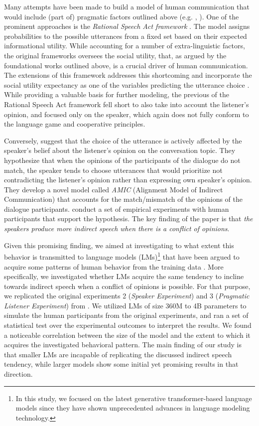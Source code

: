 \documentclass[11pt]{article}
\begin{document}
Many attempts have been made to build a model of human communication that would include (part of) pragmatic factors outlined above (e.g. \citealt{achimova-2022}, \citealt{goodman-2013}). One of the prominent approaches is the \textit{Rational Speech Act framework} \citep{goodman-2012}. The model assigns probabilities to the possible utterances from a fixed set based on their expected informational utility. While accounting for a number of extra-linguistic factors, the original frameworks oversees the social utility, that, as argued by the foundational works outlined above, is a crucial driver of human communication. The extensions of this framework addresses this shortcoming and incorporate the social utility expectancy as one of the variables predicting the utterance choice \citep{carcassi-2023}. While providing a valuable basis for further modeling, the previous of the Rational Speech Act framework fell short to also take into account the listener's opinion, and focused only on the speaker, which again does not fully conform to the language game and cooperative principles.

Conversely, \citet{achimova-2025} suggest that the choice of the utterance is actively affected by the speaker’s belief about the listener’s opinion on the conversation topic. They hypothesize that when the opinions of the participants of the dialogue do not match, the speaker tends to choose utterances that would prioritize not contradicting the listener's opinion rather than expressing own speaker's opinion. They develop a novel model called \textit{AMIC} (Alignment Model of Indirect Communication) that accounts for the match/mismatch of the opinions of the dialogue participants. \citet{achimova-2025} conduct a set of empirical experiments with human participants that support the hypothesis. The key finding of the paper is that \textit{the speakers produce more indirect speech when there is a conflict of opinions}.

Given this promising finding, we aimed at investigating to what extent this behavior is transmitted to language models (LMs)\footnote{In this study, we focused on the latest generative transformer-based language models since they have shown unprecedented advances in language modeling technology.} that have been argued to acquire some patterns of human behavior from the training data \citep{hashemi-2025}. More specifically, we investigated whether LMs acquire the same tendency to incline towards indirect speech when a conflict of opinions is possible. For that purpose, we replicated the original experiments 2 (\textit{Speaker Experiment}) and 3 (\textit{Pragmatic Listener Experiment}) from \citet{achimova-2025}. We utilized LMs of size 360M to 4B parameters to simulate the human participants from the original experiments, and ran a set of statistical test over the experimental outcomes to interpret the results. We found a noticeable correlation between the size of the model and the extent to which it acquires the investigated behavioral pattern. The main finding of our study is that smaller LMs are incapable of replicating the discussed indirect speech tendency, while larger models show some initial yet promising results in that direction.
\end{document}
